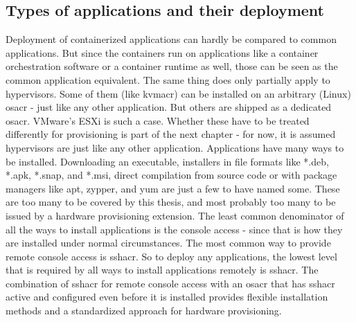 \subsection{Types of applications and their deployment}
Deployment of containerized applications can hardly be compared to common applications. But since the containers run on applications like a container orchestration software or a container runtime as well, those can be seen as the common application equivalent.
\newline
The same thing does only partially apply to hypervisors. Some of them (like \gls{kvmacr}) can be installed on an arbitrary (Linux) \gls{osacr} - just like any other application. But others are shipped as a dedicated \gls{osacr}. VMware's ESXi is such a case. Whether these have to be treated differently for provisioning is part of the next chapter - for now, it is assumed hypervisors are just like any other application.
\newline
Applications have many ways to be installed. Downloading an executable, installers in file formats like *.deb, *.apk, *.snap, and *.msi, direct compilation from source code or with package managers like apt, zypper, and yum are just a few to have named some. These are too many to be covered by this thesis, and most probably too many to be issued by a hardware provisioning extension. The least common denominator of all the ways to install applications is the console access - since that is how they are installed under normal circumstances. The most common way to provide remote console access is \gls{sshacr}. So to deploy any applications, the lowest level that is required by all ways to install applications remotely is \gls{sshacr}.
\newline
The combination of \gls{sshacr} for remote console access with an \gls{osacr} that has \gls{sshacr} active and configured even before it is installed provides flexible installation methods and a standardized approach for hardware provisioning.

